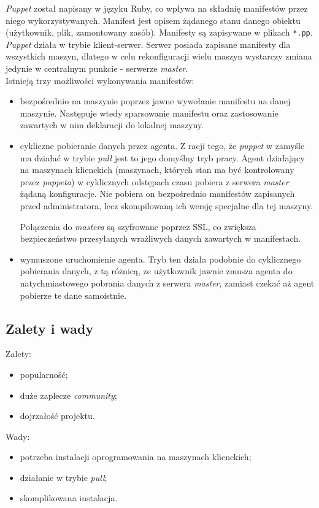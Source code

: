 \textit{Puppet} został napisany w języku Ruby, co wpływa na składnię manifestów przez niego wykorzystywanych.
Manifest jest opisem żądanego stanu danego obiektu (użytkownik, plik, zamontowany zasób).
Manifesty są zapisywane w plikach \texttt{*.pp}.
\textit{Puppet} działa w trybie klient-serwer.
Serwer posiada zapisane manifesty dla wszystkich maszyn, dlatego w celu rekonfiguracji wielu maszyn wystarczy zmiana jedynie w centralnym punkcie - serwerze \textit{master}.\\
Istnieją trzy możliwości wykonywania manifestów:
\begin{itemize}

	\item{bezpośrednio na maszynie}
		poprzez jawne wywołanie manifestu na danej maszynie. Następuje wtedy sparsowanie manifestu oraz zastosowanie zawartych w nim deklaracji do lokalnej maszyny.
	\item{cykliczne pobieranie danych przez agenta}.
		Z racji tego, że \textit{puppet} w zamyśle ma działać w trybie \textit{pull} jest to jego domyślny tryb pracy.
		Agent działający na maszynach klienckich (maszynach, których stan ma być kontrolowany przez \textit{puppeta}) w cyklicznych odstępach czasu pobiera z serwera \textit{master} żądaną konfiguracje.
		Nie pobiera on bezpośrednio manifestów zapisanych przed administratora, lecz skompilowaną ich wersję specjalne dla tej maszyny.
		
		Połączenia do \textit{mastera} są szyfrowane poprzez SSL, co zwiększa bezpieczeństwo przesyłanych wrażliwych danych zawartych w manifestach.
	\item{wymuszone uruchomienie agenta}.
		Tryb ten działa podobnie do cyklicznego pobierania danych, z tą różnicą, ze użytkownik jawnie zmusza agenta do natychmiastowego pobrania danych z serwera \textit{master}, zamiast czekać aż agent pobierze te dane samoistnie.
\end{itemize}
\subsection{Zalety i wady}
Zalety:
\begin{itemize}
	\item popularność;
	\item duże zaplecze \textit{community};
	\item dojrzałość projektu.
\end{itemize}
Wady:
\begin{itemize}
	\item potrzeba instalacji oprogramowania na maszynach klienckich;
	\item działanie w trybie \textit{pull};
	\item skomplikowana instalacja.
\end{itemize}

